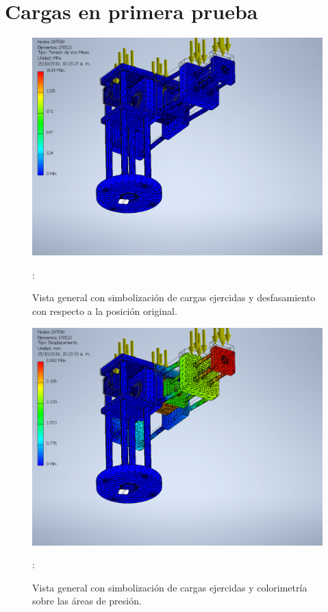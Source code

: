 \documentclass[11pt,a4paper,oldfontcommands,oneside]{memoir}
\begin{document}
\chapter{Cargas en primera prueba}

\begin{flushleft}

\begin{figure}
\begin{center}
\includegraphics[scale=.55]{ca1.png}  
\end{center}
\caption{Vista general con simbolización de cargas ejercidas y desfasamiento con respecto a la posición original.}
\label{tabla9}:
\end{figure}

\begin{figure}
\begin{center}
\includegraphics[scale=.55]{ca2.png}  
\end{center}
\caption{Vista general con simbolización de cargas ejercidas y colorimetría sobre las áreas de presión.}
\label{tabla10}:
\end{figure}


\end{flushleft}
\end{document}

